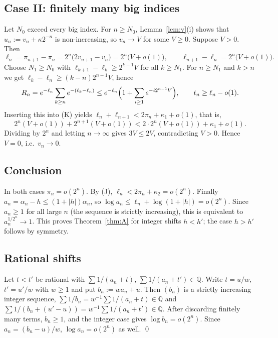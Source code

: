 \documentclass[11pt]{amsart}
\theoremstyle{definition}
\theoremstyle{remark}
\newcommand{\Q}{\mathbb{Q}}
\begin{document}
\subsection{Case II: finitely many big indices}
Let $N_0$ exceed every big index. For $n\ge N_0$, Lemma~\ref{lem:v}(i) shows that
$u_n:=v_n+\kappa2^{-n}$ is non-increasing, so $v_n\to V$ for some $V\ge0$. Suppose
$V>0$. Then
\[
\ell_n=\pi_{n+1}-\pi_n=2^n\bigl(2v_{n+1}-v_n\bigr)=2^n\bigl(V+o(1)\bigr),
\qquad \ell_{n+1}-\ell_n=2^n\bigl(V+o(1)\bigr).
\]
Choose $N_1\ge N_0$ with $\ell_{k+1}-\ell_k\ge2^{k-1}V$ for all $k\ge N_1$. For $n\ge N_1$
and $k>n$ we get $\ell_k-\ell_n\ge(k-n)2^{n-1}V$, hence
\[
R_n=e^{-\ell_n}\sum_{k\ge n}e^{-(\ell_k-\ell_n)}\le e^{-\ell_n}\Bigl(1+\sum_{i\ge1}e^{-i2^{n-1}V}\Bigr),
\qquad t_n\ge\ell_n-o(1).
\]
Inserting this into (K) yields
$\ell_n+\ell_{n+1}<2\pi_n+\kappa_1+o(1)$, that is,
\[
2^n(V+o(1))+2^{n+1}(V+o(1))<2\cdot2^n(V+o(1))+\kappa_1+o(1).
\]
Dividing by $2^n$ and letting $n\to\infty$ gives $3V\le2V$, contradicting $V>0$.
Hence $V=0$, i.e.\ $v_n\to0$.

\subsection{Conclusion}
In both cases $\pi_n=o(2^n)$. By (J), $\ell_n<2\pi_n+\kappa_2=o(2^n)$. Finally
$a_n=\alpha_n-h\le(1+|h|)\alpha_n$, so $\log a_n\le\ell_n+\log(1+|h|)=o(2^n)$.
Since $a_n\ge1$ for all large $n$ (the sequence is strictly increasing), this is
equivalent to $a_n^{1/2^n}\to1$. This proves Theorem~\ref{thm:A} for integer shifts
$h<h'$; the case $h>h'$ follows by symmetry.

\subsection{Rational shifts}\label{subsec:rational}
Let $t<t'$ be rational with $\sum1/(a_n+t)$, $\sum1/(a_n+t')\in\Q$. Write
$t=u/w$, $t'=u'/w$ with $w\ge1$ and put $b_n:=wa_n+u$. Then $(b_n)$ is a strictly
increasing integer sequence, $\sum1/b_n=w^{-1}\sum1/(a_n+t)\in\Q$ and
$\sum1/(b_n+(u'-u))=w^{-1}\sum1/(a_n+t')\in\Q$. After discarding finitely many terms,
$b_n\ge1$, and the integer case gives $\log b_n=o(2^n)$. Since $a_n=(b_n-u)/w$,
$\log a_n=o(2^n)$ as well. \qed
\end{document}
